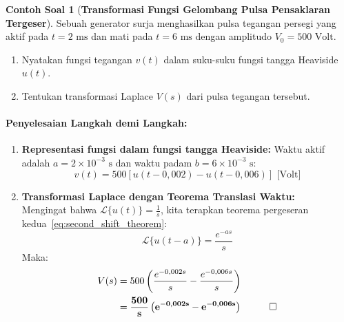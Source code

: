 \documentclass[11pt,a4paper]{article}
\theoremstyle{definition}
\newtheorem{example}{Contoh Soal}[section]
\begin{document}
\begin{example}[\textbf{Transformasi Fungsi Gelombang Pulsa Pensaklaran Tergeser}]
Sebuah generator surja menghasilkan pulsa tegangan persegi yang aktif pada $t = 2\text{ ms}$ dan mati pada $t = 6\text{ ms}$ dengan amplitudo $V_0 = 500\text{ Volt}$.
\begin{enumerate}[label=(\alph*)]
    \item Nyatakan fungsi tegangan $v(t)$ dalam suku-suku fungsi tangga Heaviside $u(t)$.
    \item Tentukan transformasi Laplace $V(s)$ dari pulsa tegangan tersebut.
\end{enumerate}

\paragraph{Penyelesaian Langkah demi Langkah:}
\begin{enumerate}[label=(\alph*), leftmargin=*]
    \item \textbf{Representasi fungsi dalam fungsi tangga Heaviside:}
    Waktu aktif adalah $a = 2 \times 10^{-3}\text{ s}$ dan waktu padam $b = 6 \times 10^{-3}\text{ s}$:
    \begin{equation*}
        v(t) = 500 \left[ u(t - 0{,}002) - u(t - 0{,}006) \right]\text{ [Volt]}
    \end{equation*}

    \item \textbf{Transformasi Laplace dengan Teorema Translasi Waktu:} \\
    Mengingat bahwa $\mathcal{L}\{u(t)\} = \frac{1}{s}$, kita terapkan teorema pergeseran kedua~\eqref{eq:second_shift_theorem}:
    \begin{equation*}
        \mathcal{L}\{u(t - a)\} = \frac{e^{-as}}{s}
    \end{equation*}
    Maka:
    \begin{align*}
        V(s) &= 500 \left( \frac{e^{-0{,}002 s}}{s} - \frac{e^{-0{,}006 s}}{s} \right) \\
             &= \mathbf{\frac{500}{s} \left( e^{-0{,}002 s} - e^{-0{,}006 s} \right)} \quad \qed
    \end{align*}
\end{enumerate}
\end{example}
\end{document}
